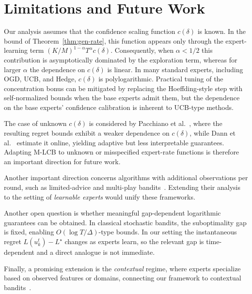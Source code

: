 \documentclass[a4paper,14pt]{extarticle}
\theoremstyle{plain}
\newcommand{\algname}[1]{{\textsf  #1}}
\begin{document}
\vspace{-0.5em}
\section{Limitations and Future Work}
Our analysis assumes that the confidence scaling function $c(\delta)$ is known. In the bound of Theorem~\ref{thm:gen-rate}, this function appears only through the expert-learning term $(K/M)^{1-\alpha}T^\alpha c(\delta)$. Consequently, when $\alpha<1/2$ this contribution is asymptotically dominated by the exploration term, whereas for larger $\alpha$ the dependence on $c(\delta)$ is linear. In many standard experts, including OGD, UCB, and Hedge, $c(\delta)$ is polylogarithmic. Practical tuning of the concentration bonus can be mitigated by replacing the Hoeffding-style step with self-normalized bounds when the base experts admit them, but the dependence on the base experts' confidence calibration is inherent to UCB-type methods.

The case of unknown $c(\delta)$ is considered by Pacchiano et al.~\cite{pacchiano2020model}, where the resulting regret bounds exhibit a weaker dependence on $c(\delta)$, while Dann et al.~\cite{dann2024data} estimate it online, yielding adaptive but less interpretable guarantees. Adapting \algname{M-LCB} to unknown or misspecified expert-rate functions is therefore an important direction for future work.

Another important direction concerns algorithms with additional observations per round,  such as limited-advice and multi-play bandits~\cite{seldin2014prediction,yun2018multi,kveton2015tight}.
Extending their analysis to the setting of \emph{learnable experts} would unify these frameworks.

Another open question is whether meaningful gap-dependent logarithmic guarantees can be obtained. In classical stochastic bandits, the suboptimality gap is fixed, enabling $O(\log T/\Delta)$-type bounds. In our setting the instantaneous regret $L(u_k^t)-L^\star$ changes as experts learn, so the relevant gap is time-dependent and a direct analogue is not immediate.

Finally, a promising extension is the \emph{contextual} regime, where experts specialize based on observed features or domains,
connecting our framework to contextual bandits~\cite{foster2019model}.

\end{document}

